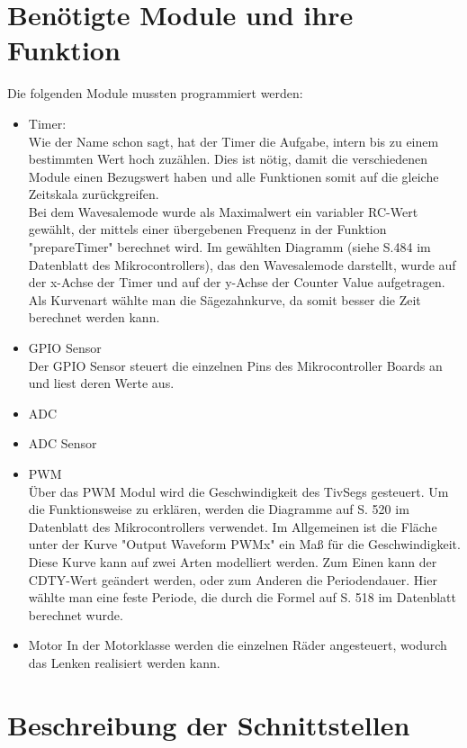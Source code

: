\documentclass[a4paper,10pt,twoside]{report}
\begin{document}
\section{Benötigte Module und ihre Funktion}
Die folgenden Module mussten programmiert werden:
\begin{itemize}
\item Timer:\\
Wie der Name schon sagt, hat der Timer die Aufgabe, intern bis zu einem bestimmten Wert hoch zuzählen. Dies ist nötig, damit die verschiedenen Module einen Bezugswert haben und alle Funktionen somit auf die gleiche Zeitskala zurückgreifen. \\
Bei dem Wavesalemode wurde als Maximalwert ein variabler RC-Wert gewählt, der mittels einer übergebenen Frequenz in der Funktion "prepareTimer" berechnet wird. Im gewählten Diagramm (siehe S.484 im Datenblatt des Mikrocontrollers), das den Wavesalemode darstellt, wurde auf der x-Achse der Timer und auf der y-Achse der Counter Value aufgetragen. Als Kurvenart wählte man die Sägezahnkurve, da somit besser die Zeit berechnet werden kann. 
\item GPIO Sensor\\
Der GPIO Sensor steuert die einzelnen Pins des Mikrocontroller Boards an und liest deren Werte aus.
\item ADC\\
\item ADC Sensor\\
\item PWM\\
Über das PWM Modul wird die Geschwindigkeit des TivSegs gesteuert. Um die Funktionsweise zu erklären, werden die Diagramme auf S. 520 im Datenblatt des Mikrocontrollers verwendet. Im Allgemeinen ist die Fläche unter der Kurve "Output Waveform PWMx" ein Maß für die Geschwindigkeit. Diese Kurve kann auf zwei Arten modelliert werden. Zum Einen kann der CDTY-Wert geändert werden, oder zum Anderen die Periodendauer. Hier wählte man eine feste Periode, die durch die Formel auf S. 518 im Datenblatt berechnet wurde.
\item Motor
In der Motorklasse werden die einzelnen Räder angesteuert, wodurch das Lenken realisiert werden kann. 

\end{itemize}


\section{Beschreibung der Schnittstellen}
\end{document}
